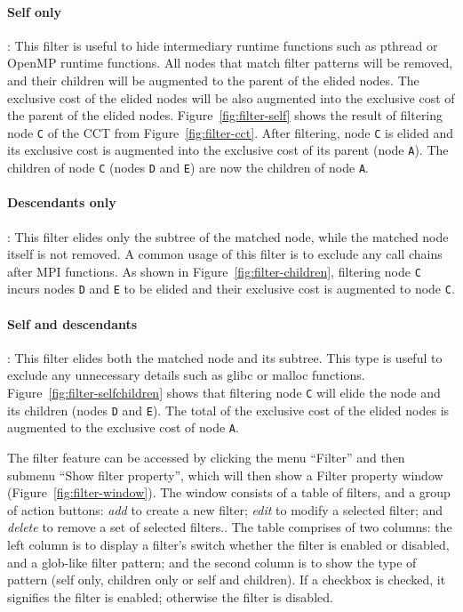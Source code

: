 \paragraph{Self only}: This filter is useful to hide intermediary runtime functions such as pthread or OpenMP runtime functions. 
All nodes that match filter patterns will be removed, and their children will be augmented to the parent of the elided nodes.
The exclusive cost of the elided nodes will be also augmented into the exclusive cost of the parent of the elided nodes.
Figure~\ref{fig:filter-self} shows the result of filtering node \texttt{C} of the CCT from Figure~\ref{fig:filter-cct}. 
After filtering, node \texttt{C} is elided and its exclusive cost is augmented into the exclusive cost of its parent (node \texttt{A}). 
The children of node \texttt{C} (nodes \texttt{D} and \texttt{E}) are now the children of node \texttt{A}.

\paragraph{Descendants only}: This filter elides only the subtree of the matched node, while the matched node itself is not removed. 
A common usage of this filter is to exclude any call chains after MPI functions.
As shown in Figure~\ref{fig:filter-children}, filtering node \texttt{C} incurs nodes \texttt{D} and \texttt{E} to be elided and their exclusive cost is augmented to node \texttt{C}. 

\paragraph{Self and descendants}: This filter elides both the matched node and its subtree. 
This type is useful to exclude any unnecessary details such as glibc or malloc functions.
Figure~\ref{fig:filter-selfchildren} shows that filtering node \texttt{C} will elide the node and its children (nodes \texttt{D} and \texttt{E}). 
The total of the exclusive cost of the elided nodes is augmented to the exclusive cost of node \texttt{A}.

The filter feature can be accessed by clicking the menu ``Filter'' and then submenu ``Show filter property'', which will then show a  Filter property window (Figure~\ref{fig:filter-window}).
The window consists of a table of filters, and a group of action buttons: \emph{add} to create a new filter; \emph{edit} to modify a selected filter; and \emph{delete} to remove a set of selected filters..
The table comprises of two columns: the left column is to display a filter's switch whether the filter is enabled or disabled, and a glob-like filter pattern; and the second column is to show the type of pattern (self only, children only or self and children).
If a checkbox is checked, it signifies the filter is enabled; otherwise the filter is disabled.

